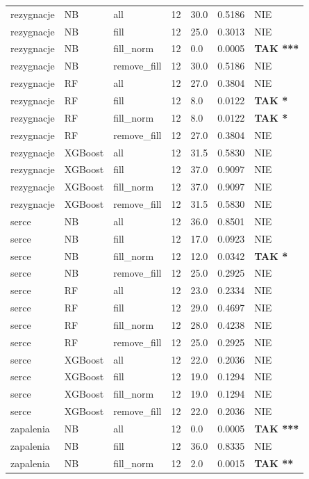 \begin{table}[htbp]
\begin{tabular}{lllrlll}
rezygnacje & NB & all & 12 & 30.0 & 0.5186 & NIE \\
rezygnacje & NB & fill & 12 & 25.0 & 0.3013 & NIE \\
rezygnacje & NB & fill_norm & 12 & 0.0 & 0.0005 & \textbf{TAK ***} \\
rezygnacje & NB & remove_fill & 12 & 30.0 & 0.5186 & NIE \\
rezygnacje & RF & all & 12 & 27.0 & 0.3804 & NIE \\
rezygnacje & RF & fill & 12 & 8.0 & 0.0122 & \textbf{TAK *} \\
rezygnacje & RF & fill_norm & 12 & 8.0 & 0.0122 & \textbf{TAK *} \\
rezygnacje & RF & remove_fill & 12 & 27.0 & 0.3804 & NIE \\
rezygnacje & XGBoost & all & 12 & 31.5 & 0.5830 & NIE \\
rezygnacje & XGBoost & fill & 12 & 37.0 & 0.9097 & NIE \\
rezygnacje & XGBoost & fill_norm & 12 & 37.0 & 0.9097 & NIE \\
rezygnacje & XGBoost & remove_fill & 12 & 31.5 & 0.5830 & NIE \\
serce & NB & all & 12 & 36.0 & 0.8501 & NIE \\
serce & NB & fill & 12 & 17.0 & 0.0923 & NIE \\
serce & NB & fill_norm & 12 & 12.0 & 0.0342 & \textbf{TAK *} \\
serce & NB & remove_fill & 12 & 25.0 & 0.2925 & NIE \\
serce & RF & all & 12 & 23.0 & 0.2334 & NIE \\
serce & RF & fill & 12 & 29.0 & 0.4697 & NIE \\
serce & RF & fill_norm & 12 & 28.0 & 0.4238 & NIE \\
serce & RF & remove_fill & 12 & 25.0 & 0.2925 & NIE \\
serce & XGBoost & all & 12 & 22.0 & 0.2036 & NIE \\
serce & XGBoost & fill & 12 & 19.0 & 0.1294 & NIE \\
serce & XGBoost & fill_norm & 12 & 19.0 & 0.1294 & NIE \\
serce & XGBoost & remove_fill & 12 & 22.0 & 0.2036 & NIE \\
zapalenia & NB & all & 12 & 0.0 & 0.0005 & \textbf{TAK ***} \\
zapalenia & NB & fill & 12 & 36.0 & 0.8335 & NIE \\
zapalenia & NB & fill_norm & 12 & 2.0 & 0.0015 & \textbf{TAK **} \\

\end{tabular}
\end{table}
